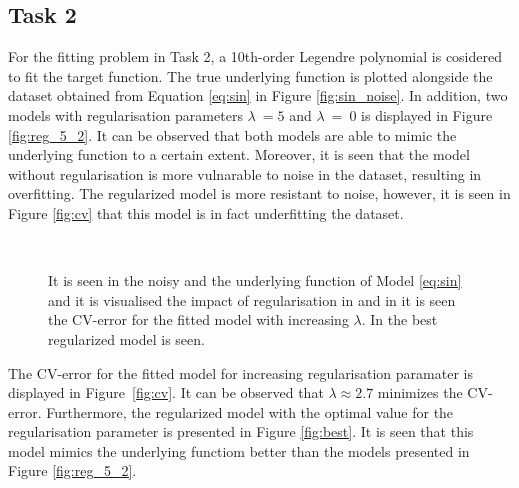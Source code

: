 \documentclass[a4paper,10pt]{article}
\begin{document}
\subsection{Task 2}
For the fitting problem in Task 2, a 10th-order Legendre polynomial is cosidered to
fit the target function. The true underlying function is plotted alongside the
dataset obtained from Equation {\ref{eq:sin}} in Figure {\ref{fig:sin_noise}}. In addition,
two models with regularisation parameters $\lambda\ = 5$ and $\lambda\ =\ 0$ is displayed in
Figure {\ref{fig:reg_5_2}}. It can be observed that both models are able to mimic
the underlying function to a certain extent. Moreover, it is seen that the model
without regularisation is more vulnarable to noise in the dataset, resulting in
overfitting. The regularized model is more resistant to noise, however, it is seen
in Figure {\ref{fig:cv}} that this model is in fact underfitting the dataset.

\begin{figure}[H]
   \\
  \caption{It is seen in \protect {} the noisy and the underlying function
  of Model {\ref{eq:sin}} and it is visualised the impact of regularisation in
  \protect {} and
  in \protect {} it is seen the
  CV-error for the fitted model with increasing $\lambda$. In \protect
   the best regularized model is seen.
  }
\end{figure}

The CV-error for the fitted model for increasing regularisation paramater
is displayed in Figure {\ref{fig:cv}}. It can be observed that
$\lambda \approx 2.7$ minimizes the CV-error. Furthermore, the regularized
model with the optimal value for the regularisation parameter is
presented in Figure {\ref{fig:best}}. It is seen that this model
mimics the underlying functiom better than the models
presented in Figure {\ref{fig:reg_5_2}}.
\end{document}

